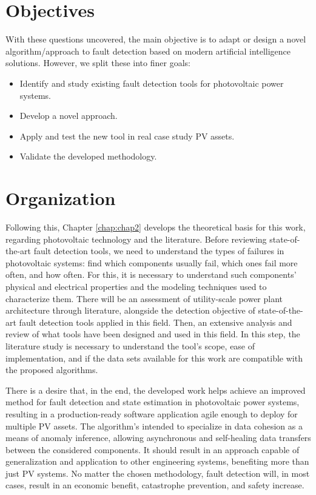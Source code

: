 \section{Objectives}

With these questions uncovered, the main objective is to adapt or design a novel algorithm/approach to fault detection based on modern artificial intelligence solutions. However, we split these into finer goals:

\begin{itemize}
    \item  Identify and study existing fault detection tools for photovoltaic
    power systems.
    \item  Develop a novel approach.
    \item Apply and test the new tool in real case study PV assets.
    \item Validate the developed methodology.
\end{itemize}

\section{Organization}

Following this, Chapter \ref{chap:chap2} develops the theoretical basis for this work, regarding photovoltaic technology and the literature. 
Before reviewing state-of-the-art fault detection tools, we need to understand the types of failures in photovoltaic systems: find which components usually fail, which ones fail more often, and how often. For this, it is necessary to understand such components' physical and electrical properties and the modeling techniques used to characterize them. There will be an assessment of utility-scale power plant architecture through literature, alongside the detection objective of state-of-the-art fault detection tools applied in this field. Then, an extensive analysis and review of what tools have been designed and used in this field. In this step, the literature study is necessary to understand the tool's scope, ease of implementation, and if the data sets available for this work are compatible with the proposed algorithms.

There is a desire that, in the end, the developed work helps achieve an improved method for fault detection and state estimation in photovoltaic power systems, resulting in a production-ready software application agile enough to deploy for multiple PV assets. The algorithm's intended to specialize in data cohesion as a means of anomaly inference, allowing asynchronous and self-healing data transfers between the considered components. It should result in an approach capable of generalization and application to other engineering systems, benefiting more than just PV systems. No matter the chosen methodology, fault detection will, in most cases, result in an economic benefit, catastrophe prevention, and safety increase.



